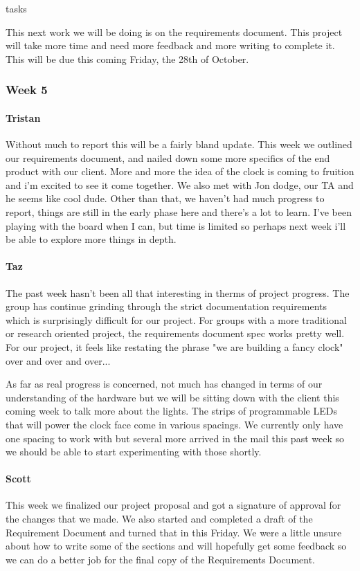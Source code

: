 tasks\documentclass[onecolumn, draftclsnofoot,10pt, compsoc]{IEEEtran}
\begin{document}
This next work we will be doing is on the requirements document. This project will take more time and need more feedback and more writing to complete it. This will be due this coming Friday, the 28th of October.
\subsubsection{Week 5}
\paragraph{Tristan}
Without much to report this will be a fairly bland update. This week we outlined our requirements document, and nailed down some more specifics of the end product with our client. More and more the idea of the clock is coming to fruition and i'm excited to see it come together. We also met with Jon dodge, our TA and he seems like cool dude. Other than that, we haven't had much progress to report, things are still in the early phase here and there's a lot to learn. I've been playing with the board when I can, but time is limited so perhaps next week i'll be able to explore more things in depth.
\paragraph{Taz}
The past week hasn't been all that interesting in therms of project progress. The group has continue grinding through the strict documentation requirements which is surprisingly difficult for our project. For groups with a more traditional or research oriented project, the requirements document spec works pretty well. For our project, it feels like restating the phrase "we are building a fancy clock" over and over and over...

As far as real progress is concerned, not much has changed in terms of our understanding of the hardware but we will be sitting down with the client this coming week to talk more about the lights. The strips of programmable LEDs that will power the clock face come in various spacings. We currently only have one spacing to work with but several more arrived in the mail this past week so we should be able to start experimenting with those shortly.
\paragraph{Scott}
This week we finalized our project proposal and got a signature of approval for the changes that we made. We also started and completed a draft of the Requirement Document and turned that in this Friday. We were a little unsure about how to write some of the sections and will hopefully get some feedback so we can do a better job for the final copy of the Requirements Document.
\end{document}

